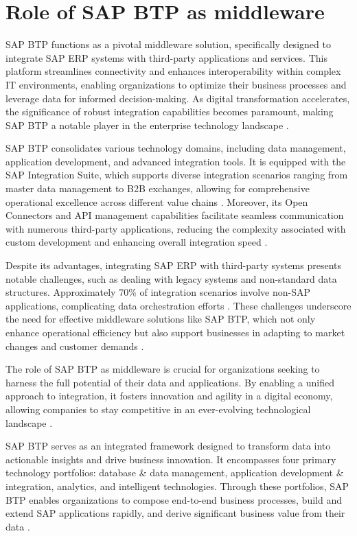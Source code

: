 \section{Role of SAP BTP as middleware}


SAP BTP functions as a pivotal middleware solution, specifically designed to integrate SAP ERP systems with third-party applications and services. This platform streamlines connectivity and enhances interoperability within complex IT environments, enabling organizations to optimize their business processes and leverage data for informed decision-making. As digital transformation accelerates, the significance of robust integration capabilities becomes paramount, making SAP BTP a notable player in the enterprise technology landscape \cite{ondevicesolutions, sap_press, sap_community}.

SAP BTP consolidates various technology domains, including data management, application development, and advanced integration tools. It is equipped with the SAP Integration Suite, which supports diverse integration scenarios ranging from master data management to B2B exchanges, allowing for comprehensive operational excellence across different value chains \cite{sap_press, leverx}. Moreover, its Open Connectors and API management capabilities facilitate seamless communication with numerous third-party applications, reducing the complexity associated with custom development and enhancing overall integration speed \cite{adilfahim, sap_community}.

Despite its advantages, integrating SAP ERP with third-party systems presents notable challenges, such as dealing with legacy systems and non-standard data structures. Approximately 70\% of integration scenarios involve non-SAP applications, complicating data orchestration efforts \cite{seeburger_blog, sap_learning}. These challenges underscore the need for effective middleware solutions like SAP BTP, which not only enhance operational efficiency but also support businesses in adapting to market changes and customer demands \cite{accely, sap_community}.

The role of SAP BTP as middleware is crucial for organizations seeking to harness the full potential of their data and applications. By enabling a unified approach to integration, it fosters innovation and agility in a digital economy, allowing companies to stay competitive in an ever-evolving technological landscape \cite{sap_community, forbes_crm}.

SAP BTP serves as an integrated framework designed to transform data into actionable insights and drive business innovation. It encompasses four primary technology portfolios: database \& data management, application development \& integration, analytics, and intelligent technologies. Through these portfolios, SAP BTP enables organizations to compose end-to-end business processes, build and extend SAP applications rapidly, and derive significant business value from their data \cite{sap_press, ondevicesolutions}.


